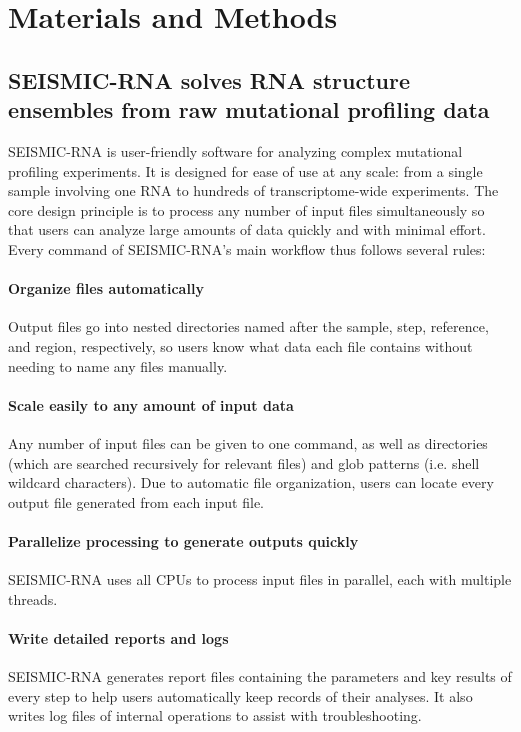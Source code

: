\documentclass[unnumsec,webpdf,contemporary,large]{oup-authoring-template}%
\theoremstyle{thmstyleone}%
\theoremstyle{thmstyletwo}%
\theoremstyle{thmstylethree}%
\begin{document}
\section{Materials and Methods}
\label{methods}

\subsection{SEISMIC-RNA solves RNA structure ensembles from raw mutational profiling data}

SEISMIC-RNA is user-friendly software for analyzing complex mutational profiling experiments.
It is designed for ease of use at any scale: from a single sample involving one RNA to hundreds of transcriptome-wide experiments.
The core design principle is to process any number of input files simultaneously so that users can analyze large amounts of data quickly and with minimal effort.
Every command of SEISMIC-RNA's main workflow thus follows several rules:

\paragraph{Organize files automatically}
Output files go into nested directories named after the sample, step, reference, and region, respectively, so users know what data each file contains without needing to name any files manually.
\paragraph{Scale easily to any amount of input data}
Any number of input files can be given to one command, as well as directories (which are searched recursively for relevant files) and glob patterns (i.e. shell wildcard characters). Due to automatic file organization, users can locate every output file generated from each input file.
\paragraph{Parallelize processing to generate outputs quickly}
SEISMIC-RNA uses all CPUs to process input files in parallel, each with multiple threads.
\paragraph{Write detailed reports and logs}
SEISMIC-RNA generates report files containing the parameters and key results of every step to help users automatically keep records of their analyses. It also writes log files of internal operations to assist with troubleshooting.
\end{document}
